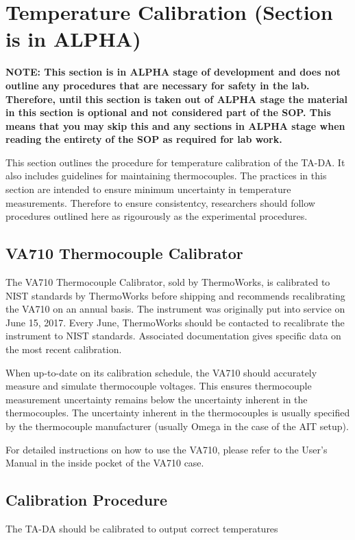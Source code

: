 \documentclass[letterpaper,11pt]{article}
\begin{document}
 
\section{Temperature Calibration (Section is in ALPHA)}
\textbf{NOTE: This section is in ALPHA stage of development and does not outline any 
procedures that are necessary for safety in the lab. Therefore, until this
section is taken out of ALPHA stage the material in this section is optional and
not considered part of the SOP. This means that you may skip this and any 
sections in ALPHA stage when reading the entirety of the SOP as required for lab
work.}

This section outlines the procedure for temperature calibration of the TA-DA.
It also includes guidelines for maintaining thermocouples. The practices in this
section are intended to ensure minimum uncertainty in temperature measurements.
Therefore to ensure consistentcy, researchers should follow procedures 
outlined here as rigourously as the experimental procedures.


    \subsection{VA710 Thermocouple Calibrator}
The VA710 Thermocouple Calibrator, sold by ThermoWorks, is calibrated to NIST 
standards by ThermoWorks before shipping and recommends recalibrating the VA710 
on an annual basis. The instrument was originally put into service on 
June 15, 2017. Every June, ThermoWorks should be contacted to recalibrate the 
instrument to NIST standards. Associated documentation gives specific data on 
the most recent calibration.

When up-to-date on its calibration schedule, the VA710 should accurately measure
and simulate thermocouple voltages. This ensures thermocouple measurement 
uncertainty remains below the uncertainty inherent in the thermocouples. The 
uncertainty inherent in the thermocouples is usually specified by the 
thermocouple manufacturer (usually Omega in the case of the AIT setup).

For detailed instructions on how to use the VA710, please refer to the User's 
Manual in the inside pocket of the VA710 case.

    \subsection{Calibration Procedure}
The TA-DA should be calibrated to output correct temperatures
\end{document}
